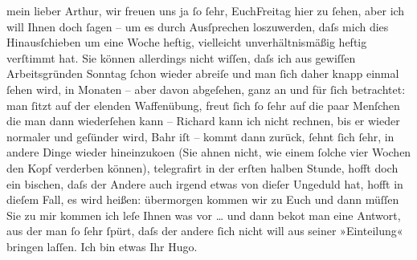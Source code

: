 \pstart{}mein lieber Arthur,\pend\vspace{0.5em}
\pstart
           wir freuen uns ja ſo ſehr, EuchFreitag hier zu ſehen, aber ich will Ihnen doch ſagen – um es durch
               Ausſprechen loszuwerden, daſs mich dies Hinausſchieben um eine Woche heftig,
               vielleicht unverhältnismäßig heftig verſtimmt hat. \label{OL450-1v}\label{OL450-1h}Sie können allerdings nicht wiſſen, {\pb}daſs ich aus gewiſſen
               Arbeitsgründen Sonntag{ }ſchon wieder abreiſe und man ſich daher knapp
               einmal ſehen wird, in Monaten – aber davon abgeſehen, ganz an und für ſich
               betrachtet: man ſitzt auf der elenden Waffenübung, freut ſich ſo ſehr auf die paar
               Menſchen {\pb}die man dann wiederſehen
               kann – Richard kann ich nicht rechnen, bis er
               wieder normaler und geſünder wird, Bahr iſt
               \label{K_L01539-1v}\label{K_L01539-1} – kommt dann zurück, ſehnt ſich ſehr, in andere Dinge
               wieder hineinzuko{\geminationm}en (Sie ahnen nicht, wie einem ſolche
               vier Wochen den Kopf verderben können), telegrafirt {\pb}in der erſten halben Stunde, hofft
               doch ein bischen, daſs der Andere auch irgend etwas von dieſer Ungeduld hat, hofft in
               dieſem Fall, es wird heißen: übermorgen kommen wir zu Euch und dann müſſen Sie zu mir
               kommen ich leſe Ihnen was vor {\dots} und dann beko{\geminationm}t man eine Antwort, aus der man ſo ſehr ſpürt, daſs der
               andere ſich nicht will aus seiner »Einteilung« bringen laſſen. Ich bin etwas \label{T_L01539-1v}\label{T_L01539-1}\pend
           \pstart Ihr \spacefill\mbox{Hugo.}\pend{}\endnumbering{}  
      